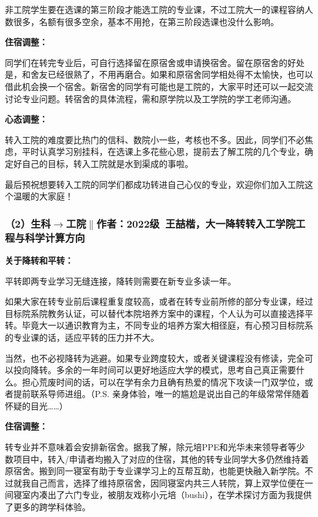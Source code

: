 \vspace{10pt}

非工院学生要在选课的第三阶段才能选工院的专业课，不过工院大一的课程容纳人数很多，名额有很多空余，基本不用抢，在第三阶段选课也没什么影响。

\textbf{住宿调整：}

同学们在转完专业后，可自行选择留在原宿舍或申请换宿舍。留在原宿舍的好处是，和舍友已经很熟了，不用再磨合。如果和原宿舍同学相处得不太愉快，也可以借此机会换一个宿舍。新宿舍的同学有可能也是工院的，大家平时还可以一起交流讨论专业问题。转宿舍的具体流程，需和原学院以及工学院的学工老师沟通。

\textbf{心态调整：}

转入工院的难度要比热门的信科、数院小一些，考核也不多。因此，同学们不必焦虑，平时认真学习别挂科，在选课上多花些心思，提前去了解工院的几个专业，确定好自己的目标，转入工院就是水到渠成的事啦。

\vspace{10pt}

最后预祝想要转入工院的同学们都成功转进自己心仪的专业，欢迎你们加入工院这个温暖的大家庭！

\subsubsection{（2）生科$\to$工院$\parallel$作者：2022级\ 王喆楷，大一降转转入工学院工程与科学计算方向}
\textbf{\textbf{关于降转和平转}}\textbf{\textbf{：}}

平转即两专业学习无缝连接，降转则需要在新专业多读一年。

\vspace{10pt}

如果大家在转专业前后课程重复度较高，或者在转专业前所修的部分专业课，经过目标院系院教务认证，可以替代本院培养方案中的课程，个人认为可以直接选择平转。毕竟大一以通识教育为主，不同专业的培养方案大相径庭，有心预习目标院系的专业课的话，适应平转的压力并不大。

\vspace{10pt}

当然，也不必视降转为逃避。如果专业跨度较大，或者关键课程没有修读，完全可以投向降转。多余的一年时间可以更好地适应大学的模式，思考自己真正需要什么。担心荒废时间的话，可以在学有余力且确有热爱的情况下攻读一门双学位，或者提前联系导师进组。（P.S. 亲身体验，唯一的尴尬是说出自己的年级常常伴随着怀疑的目光……）

\textbf{住宿调整：}

转专业并不意味着会安排新宿舍。据我了解，除元培PPE和光华未来领导者等少数项目中，转入/申请者均搬入了对应的住宿，其他的转专业同学大多仍然维持着原宿舍。搬到同一寝室有助于专业课学习上的互帮互助，也能更快融入新学院。不过就我自己而言，选择了维持原宿舍，因同寝室内共三人转院，算上双学位便在一间寝室内凑出了六门专业，被朋友戏称小元培（bushi），在学术探讨方面为我提供了更多的跨学科体验。


